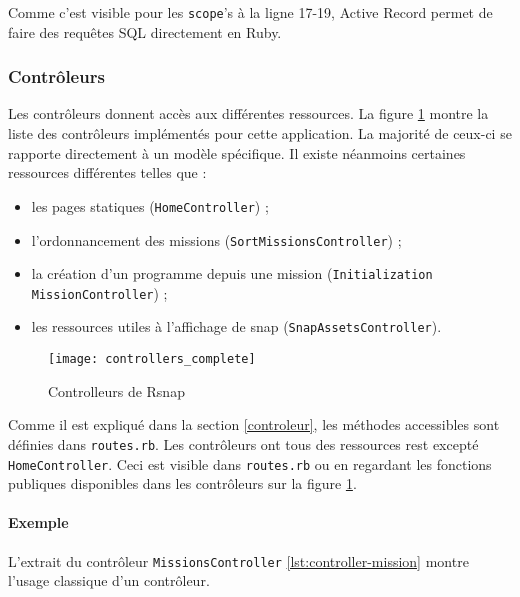 Comme c'est visible pour les \lstinline[language=Rails]{scope}'s à la ligne 17-19, Active Record permet de faire des requêtes SQL directement en Ruby.
\begin{figure}

\end{figure}

\subsubsection{Contrôleurs}
Les contrôleurs donnent accès aux différentes ressources. La figure \ref{fig:controllers} montre la liste des contrôleurs implémentés pour cette application. La majorité de ceux-ci se rapporte directement à un modèle spécifique. Il existe néanmoins certaines ressources différentes telles que :
\begin{itemize}
  \item les pages statiques (\texttt{HomeController}) ;
  \item l'ordonnancement des \glspl{mission} (\texttt{SortMissionsController}) ;
  \item la création d'un programme depuis une \gls{mission} (\texttt{Initialization} \texttt{MissionController}) ;
  \item les ressources utiles à l'affichage de \gls{snap} (\texttt{SnapAssetsController}).
\end{itemize}

\begin{figure}
 \begin{center}
   \texttt{[image: controllers\_complete]}
   \caption{Controlleurs de Rsnap}
   \label{fig:controllers}
 \end{center}
\end{figure}

Comme il est expliqué dans la section \ref{controleur}, les méthodes accessibles sont définies dans \texttt{routes.rb}. Les contrôleurs ont tous des ressources \gls{rest} excepté \texttt{HomeController}. Ceci est visible dans \texttt{routes.rb} ou en regardant les fonctions publiques disponibles dans les contrôleurs sur la figure \ref{fig:controllers}.

\paragraph{Exemple}
L'extrait du contrôleur \texttt{MissionsController} \ref{lst:controller-mission} montre l'usage classique d'un contrôleur.

